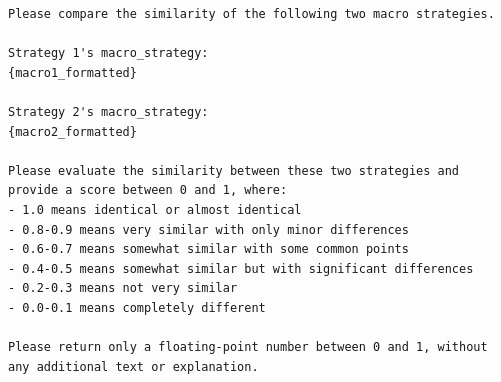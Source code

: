 \begin{Verbatim}[breaklines=true, breakanywhere=true]
Please compare the similarity of the following two macro strategies.

Strategy 1's macro_strategy:
{macro1_formatted}

Strategy 2's macro_strategy:
{macro2_formatted}

Please evaluate the similarity between these two strategies and provide a score between 0 and 1, where:
- 1.0 means identical or almost identical
- 0.8-0.9 means very similar with only minor differences
- 0.6-0.7 means somewhat similar with some common points
- 0.4-0.5 means somewhat similar but with significant differences
- 0.2-0.3 means not very similar
- 0.0-0.1 means completely different

Please return only a floating-point number between 0 and 1, without any additional text or explanation.
\end{Verbatim}



